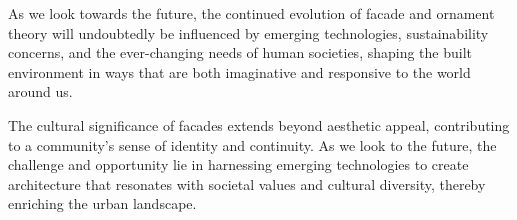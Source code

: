 As we look towards the future, the continued evolution of facade and ornament theory will undoubtedly be influenced by emerging technologies, sustainability concerns, and the ever-changing needs of human societies, shaping the built environment in ways that are both imaginative and responsive to the world around us.

The cultural significance of facades extends beyond aesthetic appeal, contributing to a community's sense of identity and continuity.
As we look to the future, the challenge and opportunity lie in harnessing emerging technologies to create architecture that resonates with societal values and cultural diversity, thereby enriching the urban landscape.




